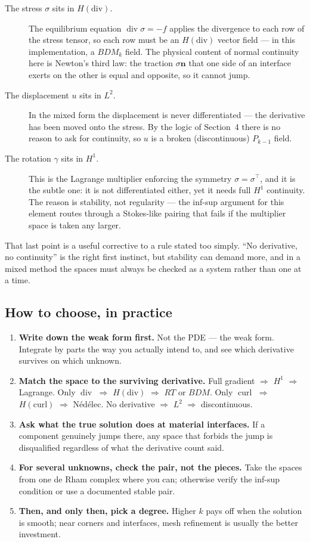 \documentclass[11pt,a4paper]{article}
\newcommand{\Hdiv}{H(\mathrm{div})}
\newcommand{\Hcurl}{H(\mathrm{curl})}
\newcommand{\dv}{\operatorname{div}}
\newcommand{\curl}{\operatorname{curl}}
\newcommand{\bn}{\mathbf{n}}
\begin{document}
\begin{description}
\item[The stress $\sigma$ sits in $\Hdiv$.] The equilibrium equation
  $\dv\sigma = -f$ applies the divergence to each row of the stress tensor, so
  each row must be an $\Hdiv$ vector field --- in this implementation, a $BDM_k$
  field. The physical content of normal continuity here is Newton's third law:
  the traction $\sigma\bn$ that one side of an interface exerts on the other is
  equal and opposite, so it cannot jump.
\item[The displacement $u$ sits in $L^2$.] In the mixed form the displacement is
  never differentiated --- the derivative has been moved onto the stress. By the
  logic of Section~4 there is no reason to ask for continuity, so $u$ is a
  broken (discontinuous) $P_{k-1}$ field.
\item[The rotation $\gamma$ sits in $H^1$.] This is the Lagrange multiplier
  enforcing the symmetry $\sigma = \sigma^{\!\top}$, and it is the subtle one:
  it is not differentiated either, yet it needs full $H^1$ continuity. The
  reason is stability, not regularity --- the inf-sup argument for this element
  routes through a Stokes-like pairing that fails if the multiplier space is
  taken any larger.
\end{description}

That last point is a useful corrective to a rule stated too simply. ``No
derivative, no continuity'' is the right first instinct, but stability can
demand more, and in a mixed method the spaces must always be checked as a
system rather than one at a time.

\subsection{How to choose, in practice}

\begin{enumerate}
\item \textbf{Write down the weak form first.} Not the PDE --- the weak form.
  Integrate by parts the way you actually intend to, and see which derivative
  survives on which unknown.
\item \textbf{Match the space to the surviving derivative.} Full gradient
  $\Rightarrow$ $H^1$ $\Rightarrow$ Lagrange. Only $\dv$ $\Rightarrow$ $\Hdiv$
  $\Rightarrow$ $RT$ or $BDM$. Only $\curl$ $\Rightarrow$ $\Hcurl$
  $\Rightarrow$ Nédélec. No derivative $\Rightarrow$ $L^2$ $\Rightarrow$
  discontinuous.
\item \textbf{Ask what the true solution does at material interfaces.} If a
  component genuinely jumps there, any space that forbids the jump is
  disqualified regardless of what the derivative count said.
\item \textbf{For several unknowns, check the pair, not the pieces.} Take the
  spaces from one de Rham complex where you can; otherwise verify the inf-sup
  condition or use a documented stable pair.
\item \textbf{Then, and only then, pick a degree.} Higher $k$ pays off when the
  solution is smooth; near corners and interfaces, mesh refinement is usually
  the better investment.
\end{enumerate}
\end{document}
